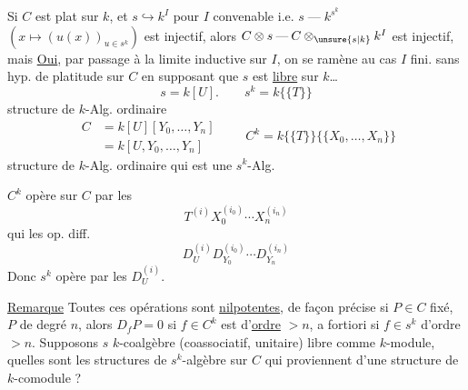 Si $C$ est plat sur $k$, et $s\hookrightarrow k^I$ pour $I$ convenable
i.e. $s\mathbin{\text{---}}k^{s^k}$ $(x\longmapsto(u(x))_{u\in s^k})$ est injectif,
alors $C\otimes s\mathbin{\text{---}}C\otimes_{\unsure{s|k}}k^I$ est injectif, mais
\diagram{\[
\begin{array}{rclll}
C\otimes_k k^{(I)}&\longrightarrow&(C\otimes_k k)^I=&C^I&\text{est-il injectif ?}\\
&&&\text{\textquotedbl}&\\
&&&\operatorname{Hom}(k^{(I)},C).&
\end{array}
\]}
\uline{Oui}, par passage à la limite inductive sur $I$, on se ramène au cas $I$ fini\unsure{---}.
 sans hyp. de platitude sur $C$ en supposant que $s$ est \uline{libre} sur $k$\ldots
{}
\[
 s=k[U].\qquad s^k=k\{\{T\}\}
\]
structure de $k$-Alg. ordinaire
\[
 \begin{aligned}
 C&=k[U][Y_0,\ldots,Y_n]\\
  &=k[U,Y_0,\ldots,Y_n]
 \end{aligned}
 \qquad C^k=k\{\{T\}\}\{\{X_0,\ldots,X_n\}\}
\]
structure de $k$-Alg. ordinaire qui est une $s^k$-Alg.

$C^k$ opère sur $C$ par les
\[
 T^{(i)}X_0^{(i_0)}\cdots X_n^{(i_n)}
\]
qui  les op. diff.
\[
 D_U^{(i)}D_{Y_0}^{(i_0)}\cdots D_{Y_n}^{(i_n)}
\]
 Donc $s^k$ opère par les $D_U^{(i)}$.

\uline{Remarque} Toutes ces opérations sont \uline{nilpotentes}, de façon précise si $P\in C$ fixé, $P$ de degré $n$,
alors $D_fP=0$ si $f\in C^k$ est d'\uline{ordre} $>n$,
a fortiori si $f\in s^k$ d'ordre $>n$.
Supposons $s$ $k$-coalgèbre (coassociatif, unitaire)
libre comme $k$-module, quelles sont les structures de $s^k$-algèbre sur  $C$ qui
proviennent d'une structure de $k$-comodule ?
